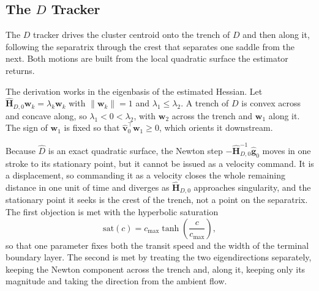 \documentclass[lettersize,journal]{IEEEtran}
\begin{document}
\subsection{The $D$ Tracker}
\label{sec:sep_controller}

The $D$ tracker drives the cluster centroid onto the trench of $D$ and
then along it, following the separatrix through the crest that separates
one saddle from the next. Both motions are built from the local
quadratic surface the estimator returns.

The derivation works in the eigenbasis of the estimated Hessian. Let
$\hat{\mathbf{H}}_{D,0}\mathbf{w}_k = \lambda_k \mathbf{w}_k$ with
$\|\mathbf{w}_k\| = 1$ and $\lambda_1 \leq \lambda_2$. A trench of $D$
is convex across and concave along, so $\lambda_1 < 0 < \lambda_2$,
with $\mathbf{w}_2$ across the trench and $\mathbf{w}_1$ along it. The
sign of $\mathbf{w}_1$ is fixed so that $\hat{\mathbf{v}}_0^\top
\mathbf{w}_1 \geq 0$, which orients it downstream.

Because $\hat{D}$ is an exact quadratic surface, the Newton step
$-\hat{\mathbf{H}}_{D,0}^{-1}\hat{\mathbf{g}}_0$ moves in one stroke to
its stationary point, but it cannot be issued as a velocity command.
It is a displacement, so commanding it as a velocity closes the whole
remaining distance in one unit of time and diverges as
$\hat{\mathbf{H}}_{D,0}$ approaches singularity, and the stationary
point it seeks is the crest of the trench, not a point on the
separatrix. The first objection is met with the hyperbolic saturation
\begin{equation}
    \mathrm{sat}(c) = c_{\max} \tanh\!\left(\frac{c}{c_{\max}}\right),
\end{equation}
so that one parameter fixes both the transit speed and the width of the
terminal boundary layer. The second is met by treating the two
eigendirections separately, keeping the Newton component across the
trench and, along it, keeping only its magnitude and taking the
direction from the ambient flow.
\end{document}

